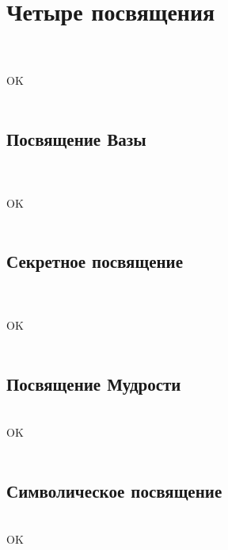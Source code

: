 \section{Четыре посвящения}
\\
\ti
\\
\ru
OK\\
\\
\subsection{Посвящение Вазы}
\\
\ti
\\
\ru
OK\\
\\
\subsection{Секретное посвящение}
\\
\ti
\\
\ru
OK\\
\\
\subsection{Посвящение Мудрости}
\\
\ti
\ru
OK\\
\\
\subsection{Символическое посвящение}
\\
\ti
\ru
OK\\
\\